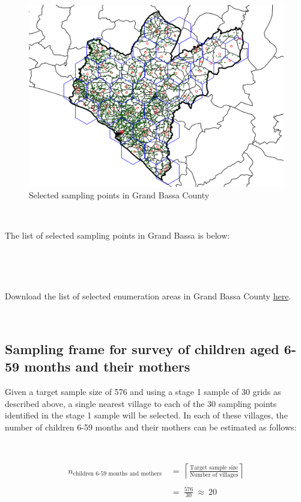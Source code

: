 \documentclass[12pt,a4paper]{book}
\theoremstyle{definition}
\theoremstyle{definition}
\theoremstyle{definition}
\theoremstyle{remark}
\let\BeginKnitrBlock\begin \let\EndKnitrBlock\end
\begin{document}
\begin{figure}[H]

\includegraphics{figures/sample25-1} \hfill{}

\caption{Selected sampling points in Grand Bassa County}\label{fig:sample25}
\end{figure}

~

The list of selected sampling points in Grand Bassa is below:

~

~

\BeginKnitrBlock{rmddownload}
Download the list of selected enumeration areas in Grand Bassa County
\href{data/grandBassaSPlist.csv}{here}.
\EndKnitrBlock{rmddownload}

~

\hypertarget{sampling-frame-for-survey-of-children-aged-6-59-months-and-their-mothers}{%
\subsection{Sampling frame for survey of children aged 6-59 months and
their
mothers}\label{sampling-frame-for-survey-of-children-aged-6-59-months-and-their-mothers}}

Given a target sample size of 576 and using a stage 1 sample of 30 grids
as described above, a single nearest village to each of the 30 sampling
points identified in the stage 1 sample will be selected. In each of
these villages, the number of children 6-59 months and their mothers can
be estimated as follows:

~

\[\begin{aligned} 
n_{\text{children 6-59 months and mothers}} & ~ = ~ \left \lceil \frac{\text{Target sample size}}{\text{Number of villages}} \right \rceil \\
\\
& ~ = ~ \frac{576}{30} ~ \approx ~ 20
\end{aligned}\]
\end{document}
